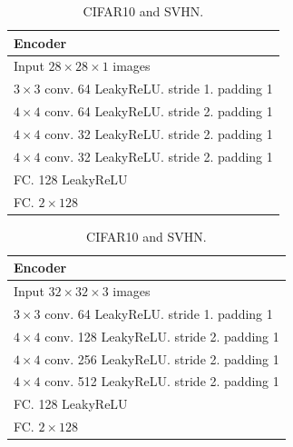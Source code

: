 \begin{table}[!h]
\caption{Architecture of CEBM}
    \centering
    \begin{subtable}[h]{.5\linewidth}
    \caption{MNIST and Fashion-MNIST.}
    \centering
        \begin{tabular}{|l|}
        \toprule
        \textbf{Encoder} \\
        \midrule
        Input $28\times28\times1$ images  \\
        \hline 
        $3\times3$ conv. 64 LeakyReLU. stride 1. padding 1  \\
        \hline 
        $4\times4$ conv. 64 LeakyReLU. stride 2. padding 1 \\
        \hline 
        $4\times4$ conv. 32 LeakyReLU. stride 2. padding 1  \\
        \hline
        $4\times4$ conv. 32 LeakyReLU. stride 2. padding 1 \\
        \hline
        FC. 128 LeakyReLU \\
        \hline
        FC. $2\times128$ \\
        \bottomrule
        \end{tabular}
    \end{subtable}%
    \begin{subtable}[h]{.5\textwidth}
    \caption{CIFAR10 and SVHN.}
    \centering
        \begin{tabular}{|l|}
        \toprule
        \textbf{Encoder}  \\
        \midrule
        Input $32\times32\times3$ images  \\
        \hline 
        $3\times3$ conv. 64 LeakyReLU. stride 1. padding 1  \\
        \hline 
        $4\times4$ conv. 128 LeakyReLU. stride 2. padding 1 \\
        \hline 
        $4\times4$ conv. 256 LeakyReLU. stride 2. padding 1  \\
        \hline
        $4\times4$ conv. 512 LeakyReLU. stride 2. padding 1  \\
        \hline
        FC. 128 LeakyReLU \\
        \hline
        FC. $2\times128$\\
        \bottomrule
        \end{tabular}
    \vspace*{1ex}
    \end{subtable}
    \label{appendex:tab:arch-cebm}
\end{table}



